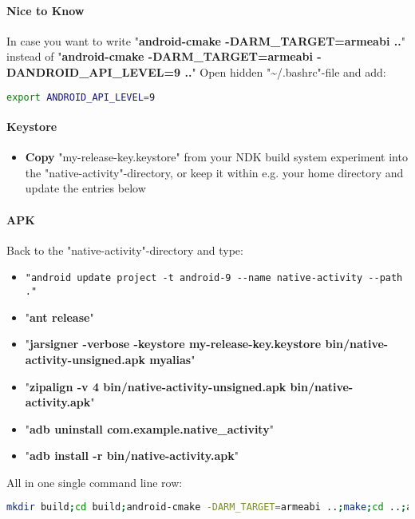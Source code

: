 \paragraph{Nice to Know}
In case you want to write "\textbf{android-cmake -DARM\_TARGET=armeabi ..}" instead of "\textbf{android-cmake -DARM\_TARGET=armeabi -DANDROID\_API\_LEVEL=9 ..}" \textrightarrow{} Open hidden "\textasciitilde /.bashrc"-file and add:
\begin{lstlisting}[language=sh]
export ANDROID_API_LEVEL=9
\end{lstlisting}


\paragraph{Keystore}
\begin{itemize}
\item{\textbf{Copy} "my-release-key.keystore" from your \ac{NDK} build system experiment into the "native-activity"-directory, or keep it within e.g. your home directory and update the entries below}
\end{itemize}


\paragraph{\ac{APK}}
Back to the "native-activity"-directory and type:
\begin{itemize}
\item{\verb+"android update project -t android-9 --name native-activity --path ."+}
\item{"\textbf{ant release}"}
\item{"\textbf{jarsigner -verbose -keystore my-release-key.keystore bin/native-activity-unsigned.apk myalias}"}
\item{"\textbf{zipalign -v 4 bin/native-activity-unsigned.apk bin/native-activity.apk}"}
\item{"\textbf{adb uninstall com.example.native\_activity}"}
\item{"\textbf{adb install -r bin/native-activity.apk}"}
\end{itemize}

All in one single command line row:
\begin{lstlisting}[language=sh]
mkdir build;cd build;android-cmake -DARM_TARGET=armeabi ..;make;cd ..;android update project -t android-9 --name native-activity --path .;ant release;jarsigner -verbose -keystore my-release-key.keystore bin/native-activity-unsigned.apk myalias;rm bin/native-activity.apk;zipalign -v 4 bin/native-activity-unsigned.apk bin/native-activity.apk;adb uninstall com.example.native_activity;adb install -r bin/native-activity.apk
\end{lstlisting}




